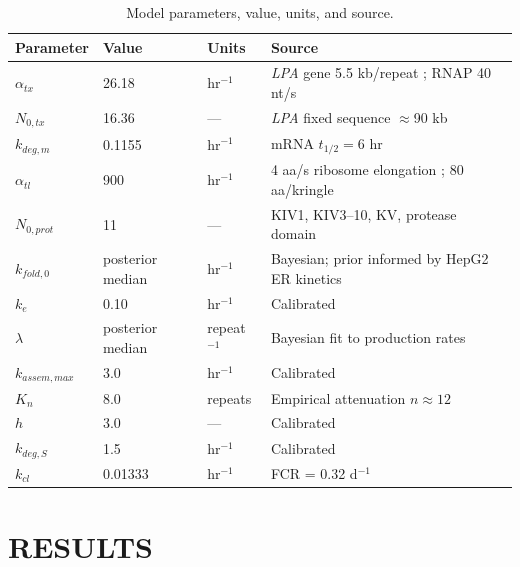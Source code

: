 \documentclass[12pt,letterpaper]{article}
\begin{document}
\begin{table}[ht]
\centering
\caption{Model parameters, value, units, and source.}
\begin{tabular}{llll}
\toprule
\textbf{Parameter} & \textbf{Value} & \textbf{Units} & \textbf{Source} \\
\midrule
$\alpha_{tx}$      & 26.18              & hr$^{-1}$         & \textit{LPA} gene 5.5 kb/repeat \citep{mclean1987cdna}; RNAP 40 nt/s \citep{jonkers2015getting} \\
$N_{0,tx}$         & 16.36              & ---               & \textit{LPA} fixed sequence $\approx$90 kb \citep{mclean1987cdna,schmidt2016structure} \\
$k_{deg,m}$        & 0.1155             & hr$^{-1}$         & mRNA $t_{1/2} = 6$ hr \citep{sharova2009database} \\
$\alpha_{tl}$      & 900                & hr$^{-1}$         & 4 aa/s ribosome elongation \citep{ingolia2011ribosome}; 80 aa/kringle \citep{schmidt2016structure} \\
$N_{0,prot}$       & 11                 & ---               & KIV1, KIV3--10, KV, protease domain \citep{schmidt2016structure} \\
$k_{fold,0}$       & posterior median   & hr$^{-1}$         & Bayesian; prior informed by HepG2 ER kinetics \citep{white1994molecular} \\
$k_e$              & 0.10               & hr$^{-1}$         & Calibrated \\
$\lambda$          & posterior median   & repeat$^{-1}$     & Bayesian fit to production rates \citep{rader1994inverse} \\
$k_{assem,max}$    & 3.0                & hr$^{-1}$         & Calibrated \\
$K_n$              & 8.0                & repeats           & Empirical attenuation $n \approx 12$\ \quad \citep{mukamel2021protein} \\
$h$                & 3.0                & ---               & Calibrated \\
$k_{deg,S}$        & 1.5                & hr$^{-1}$         & Calibrated \\
$k_{cl}$           & 0.01333            & hr$^{-1}$         & FCR = 0.32 d$^{-1}$ \ \quad \citep{rader1994inverse} \\
\bottomrule
\end{tabular}
\end{table}


\section{RESULTS}
\end{document}
